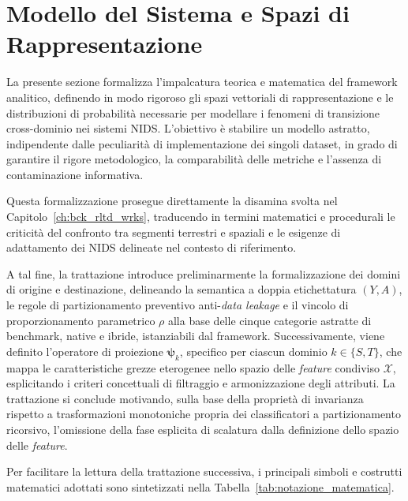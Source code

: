 \section{Modello del Sistema e Spazi di Rappresentazione}
\label{sec:modello_sistema}

La presente sezione formalizza l'impalcatura teorica e matematica del framework analitico, definendo in modo rigoroso gli spazi vettoriali di rappresentazione e le distribuzioni di probabilità necessarie per modellare i fenomeni di transizione cross-dominio nei sistemi NIDS. 
L'obiettivo è stabilire un modello astratto, indipendente dalle peculiarità di implementazione dei singoli dataset, in grado di garantire il rigore metodologico, la comparabilità delle metriche e l'assenza di contaminazione informativa.

Questa formalizzazione prosegue direttamente la disamina svolta nel Capitolo~\ref{ch:bck_rltd_wrks}, traducendo in termini matematici e procedurali le criticità del confronto tra segmenti terrestri e spaziali e le esigenze di adattamento dei NIDS delineate nel contesto di riferimento.

A tal fine, la trattazione introduce preliminarmente la formalizzazione dei domini di origine e destinazione, delineando la semantica a doppia etichettatura $(Y, A)$, le regole di partizionamento preventivo anti-\textit{data leakage} e il vincolo di proporzionamento parametrico $\rho$ alla base delle cinque categorie astratte di benchmark, native e ibride, istanziabili dal framework. 
Successivamente, viene definito l'operatore di proiezione $\boldsymbol{\psi}_k$, specifico per ciascun dominio $k \in \{S, T\}$, che mappa le caratteristiche grezze eterogenee nello spazio delle \textit{feature} condiviso $\mathcal{X}$, esplicitando i criteri concettuali di filtraggio e armonizzazione degli attributi. 
La trattazione si conclude motivando, sulla base della proprietà di invarianza rispetto a trasformazioni monotoniche propria dei classificatori a partizionamento ricorsivo, l'omissione della fase esplicita di scalatura dalla definizione dello spazio delle \textit{feature}.

Per facilitare la lettura della trattazione successiva, i principali simboli e costrutti matematici adottati sono sintetizzati nella Tabella~\ref{tab:notazione_matematica}.

